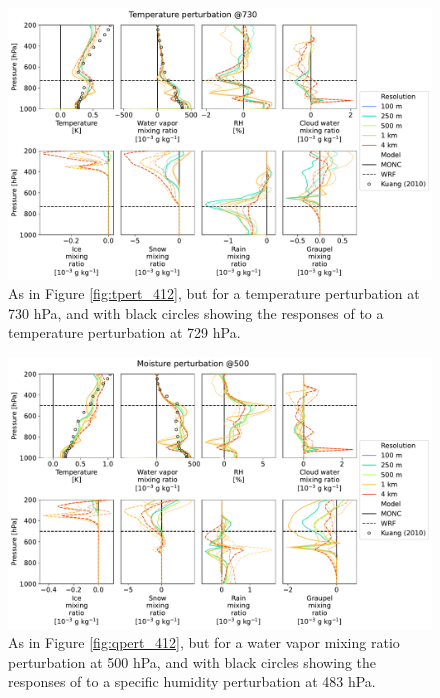 \documentclass[draft]{agujournal2019}
\begin{document}
\begin{figure}[pth]
    \noindent\includegraphics[width=\textwidth]{figures/pert_diffs_T_0.5_@730}
    \caption{As in Figure \ref{fig:tpert_412}, but for a temperature
    perturbation at 730 hPa, and with black circles showing the responses of
     to a temperature perturbation at 729 hPa.}
    \label{fig:tpert_730}
\end{figure}

\begin{figure}[pth]
    \noindent\includegraphics[width=\textwidth]{figures/pert_diffs_q_0.0002_@500}
    \caption{As in Figure \ref{fig:qpert_412}, but for a water vapor mixing
    ratio perturbation at 500 hPa, and with black circles showing the responses
    of  to a specific humidity perturbation at 483 hPa.}
    \label{fig:qpert_500}
\end{figure}
\end{document}
